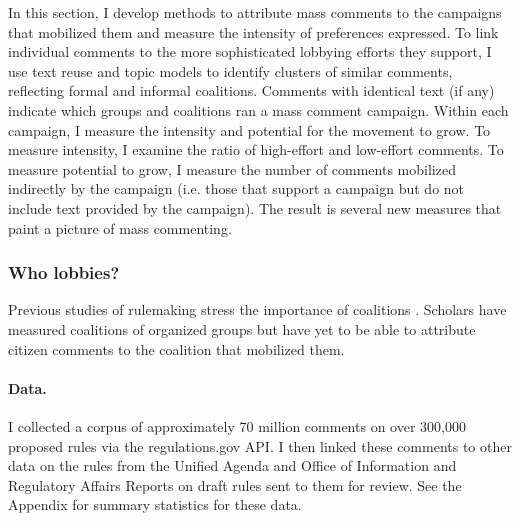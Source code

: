 In this section, I develop methods to attribute mass comments to the campaigns that mobilized them and measure the intensity of preferences expressed. 
To link individual comments to the more sophisticated lobbying efforts they support, I use text reuse and topic models to identify clusters of similar comments, reflecting formal and informal coalitions. Comments with identical text (if any) indicate which groups and coalitions ran a mass comment campaign. Within each campaign, I measure the intensity and potential for the movement to grow. To measure intensity, I examine the ratio of high-effort and low-effort comments. To measure potential to grow, I measure the number of comments mobilized indirectly by the campaign (i.e. those that support a campaign but do not include text provided by the campaign).
The result is several new measures that paint a picture of mass commenting. 

\subsubsection{Who lobbies?}
Previous studies of rulemaking stress the importance of coalitions \citep{Yackee2006JOP}. Scholars have measured coalitions of organized groups but have yet to be able to attribute citizen comments to the coalition that mobilized them.


\paragraph{Data.} I collected a corpus of approximately 70 million comments on over 300,000 proposed rules via the regulations.gov API. I then linked these comments to other data on the rules from the Unified Agenda and Office of Information and Regulatory Affairs Reports on draft rules sent to them for review. See the Appendix for summary statistics for these data.

